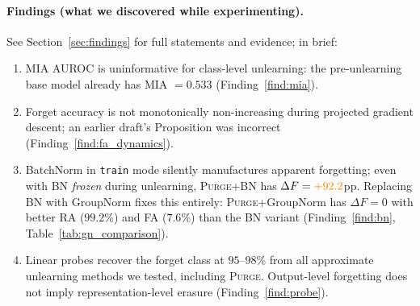 \documentclass{article}
\newcommand{\ours}{\textsc{Purge}}
\newcommand{\new}[1]{{\color{orange}#1}}
\begin{document}
{\paragraph{Findings (what we discovered while experimenting).} See Section~\ref{sec:findings} for full statements and evidence; in brief:
\begin{enumerate}[nosep,leftmargin=*]
\item MIA AUROC is uninformative for class-level unlearning: the pre-unlearning base model already has MIA $= 0.533$ (Finding~\ref{find:mia}).
\item Forget accuracy is not monotonically non-increasing during projected gradient descent; an earlier draft's Proposition was incorrect (Finding~\ref{find:fa_dynamics}).
\item BatchNorm in \texttt{train} mode silently manufactures apparent forgetting; even with BN \emph{frozen} during unlearning, \ours{}+BN has $\Delta F = \new{+92.2}$pp. Replacing BN with GroupNorm fixes this entirely: \ours{}+GroupNorm has $\Delta F = 0$ with better RA ($99.2$\%) and FA ($7.6$\%) than the BN variant (Finding~\ref{find:bn}, Table~\ref{tab:gn_comparison}).
\item Linear probes recover the forget class at $95$--$98$\% from all approximate unlearning methods we tested, including \ours{}. Output-level forgetting does not imply representation-level erasure (Finding~\ref{find:probe}).
\end{enumerate}

}
\end{document}
